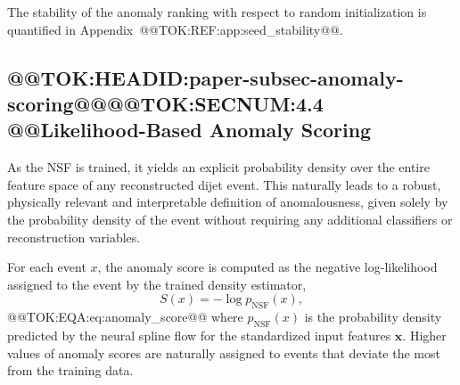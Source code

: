 \documentclass[11pt]{article}
\begin{document}
The stability of the anomaly ranking with respect to random initialization is quantified in Appendix~@@TOK:REF:app:seed_stability@@.

\subsection{@@TOK:HEADID:paper-subsec-anomaly-scoring@@@@TOK:SECNUM:4.4 @@Likelihood-Based Anomaly Scoring}

As the NSF is trained, it yields an explicit probability density over the entire feature space of any reconstructed dijet event. This naturally leads to a robust, physically relevant and interpretable definition of anomalousness, given solely by the probability density of the event without requiring any additional classifiers or reconstruction variables.

For each event $x$, the anomaly score is computed as the negative log-likelihood assigned to the event by the trained density estimator,
\begin{equation}
S(x) = -\log p_{\mathrm{NSF}}(x),

\end{equation}@@TOK:EQA:eq:anomaly_score@@
where $p_{\mathrm{NSF}}(x)$ is the probability density predicted by the neural spline flow for the standardized input features $\mathbf{x}$. Higher values of anomaly scores are naturally assigned to events that deviate the most from the training data.
\end{document}

